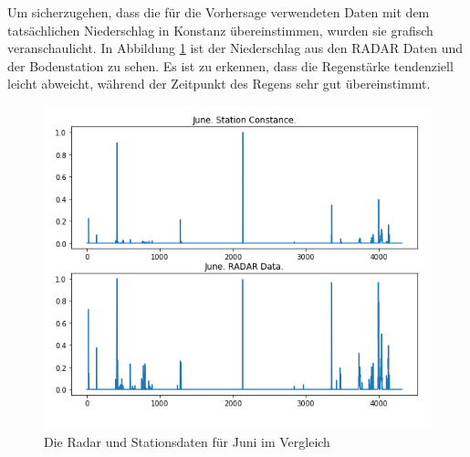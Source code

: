 \noindent
Um sicherzugehen, dass die für die Vorhersage verwendeten Daten mit dem tatsächlichen Niederschlag in Konstanz übereinstimmen, wurden sie grafisch veranschaulicht. 
In Abbildung \ref{fig:radar_station_daten_vergleich} ist der Niederschlag aus den RADAR Daten und der Bodenstation zu sehen. 
Es ist zu erkennen, dass die Regenstärke tendenziell leicht abweicht, während der Zeitpunkt des Regens sehr gut übereinstimmt.  
\begin{figure}[H]
    \centering
    \includegraphics[width=1\textwidth,angle=0]{abb/radar_station_daten_vergleich_June}
    \caption[Radar und Stationsdaten]{Die Radar und Stationsdaten für Juni im Vergleich}
   \label{fig:radar_station_daten_vergleich}
\end{figure}
 